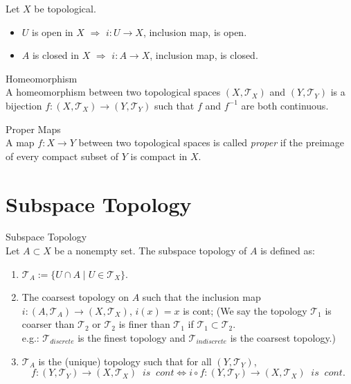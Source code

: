 \begin{proposition}
    Let $X$ be topological.
    \begin{itemize}
        \item $U$ is open in $X$ $\Rightarrow$ $i : U \to X$, inclusion map, is open.
        \item $A$ is closed in $X$ $\Rightarrow$ $i : A \to X$, inclusion map, is closed.
    \end{itemize}
\end{proposition}

\begin{definition}{Homeomorphism}\\
A homeomorphism between two topological spaces $(X, \mathcal{T}_X)$ and $(Y,\mathcal{T}_Y)$ is a bijection $f: (X, \mathcal{T}_X) \rightarrow (Y,\mathcal{T}_Y)$ such that $f$ and $f ^{-1}$ are both continuous.
\end{definition}

\begin{definition}{Proper Maps}\\
A map $f: X \to Y$ between two topological spaces is called \textit{proper} if the preimage of every compact subset of $Y$ is compact in $X$.
\end{definition}

\section{Subspace Topology}

\begin{definition}{Subspace Topology}\\
Let $A\subset X$ be a nonempty set. The subspace topology of $A$ is defined as:
\begin{enumerate}
    \item $\mathcal{T}_A := \{U \cap A \mid U \in \mathcal{T}_X\}$.
    \item The coarsest topology on $A$ such that the inclusion map $i : (A,\mathcal{T}_A) \rightarrow (X,\mathcal{T}_X)$, $i(x) =x$ is cont;
    (We say the topology $\mathcal{T}_1$ is coarser than $\mathcal{T}_2$ or $\mathcal{T}_2$ is finer than $\mathcal{T}_1$ if $\mathcal{T}_1\subset \mathcal{T}_2$.\\
    e.g.: $\mathcal{T}_{discrete}$ is the finest topology and $\mathcal{T}_{indiscrete}$ is the coarsest topology.)
    \item $\mathcal{T}_A$ is the (unique) topology such that for all $(Y,\mathcal{T}_Y)$,
    $$f: (Y,\mathcal{T}_Y) \rightarrow (X,\mathcal{T}_X) \;\; is \;\;cont \Leftrightarrow i\circ f:(Y,\mathcal{T}_Y) \rightarrow (X,\mathcal{T}_X) \;\; is \;\;cont.$$
\end{enumerate}
\end{definition}

